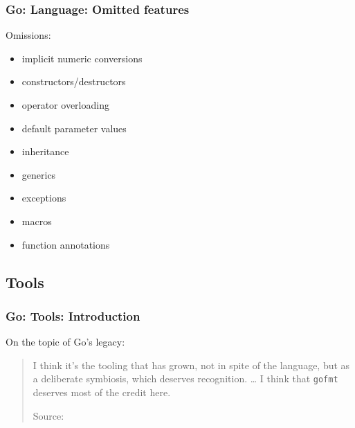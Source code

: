\begin{frame}[t]
  \frametitle{Go: Language: Omitted features}

  Omissions:

  \begin{itemize}
  \item implicit numeric conversions
  \item constructors/destructors
  \item operator overloading
  \item default parameter values
  \item inheritance
  \item generics
  \item exceptions
  \item macros
  \item function annotations
  \end{itemize}
\end{frame}

\subsection{Tools}

\begin{frame}[t]
  \frametitle{Go: Tools: Introduction}

  On the topic of Go's legacy:
  \begin{quote}
    I think it's the tooling that has grown, not in spite of the language, but as a deliberate symbiosis, which deserves recognition.
    \dots{}
    I think that \texttt{gofmt} deserves most of the credit here.

    \begin{flushright}
      \begin{minipage}{0.75\linewidth}
        \raggedright
        \footnotesize
        Source:
      \end{minipage}
    \end{flushright}
  \end{quote}

\end{frame}

